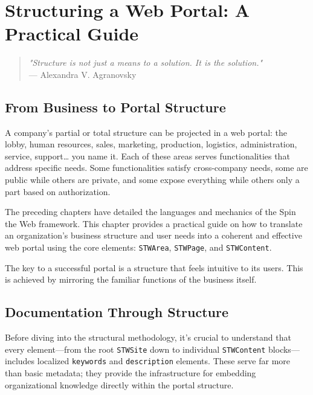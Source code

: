 \chapter{Structuring a Web Portal: A Practical Guide}
\label{chap:portal-structure}

\begin{quote}
\textit{"Structure is not just a means to a solution. It is the solution."} \\
— Alexandra V. Agranovsky
\end{quote}

\section{From Business to Portal Structure}
\label{sec:business-to-portal}

A company's partial or total structure can be projected in a web portal: the lobby, human resources, sales, marketing, production, logistics, administration, service, support… you name it. Each of these areas serves functionalities that address specific needs. Some functionalities satisfy cross-company needs, some are public while others are private, and some expose everything while others only a part based on authorization.

The preceding chapters have detailed the languages and mechanics of the Spin the Web framework. This chapter provides a practical guide on how to translate an organization's business structure and user needs into a coherent and effective web portal using the core \wbdl{} elements: \texttt{STWArea}, \texttt{STWPage}, and \texttt{STWContent}.

The key to a successful portal is a structure that feels intuitive to its users. This is achieved by mirroring the familiar functions of the business itself.

\section{Documentation Through Structure}
\label{sec:documentation-structure}

Before diving into the structural methodology, it's crucial to understand that every \wbdl{} element—from the root \texttt{STWSite} down to individual \texttt{STWContent} blocks—includes localized \texttt{keywords} and \texttt{description} elements. These serve far more than basic metadata; they provide the infrastructure for embedding organizational knowledge directly within the portal structure.

